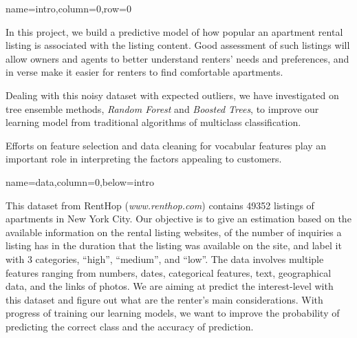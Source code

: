 \documentclass[landscape,final,a0paper,fontscale=0.285]{baposter}
\begin{document}
\begin{poster}
  {name=intro,column=0,row=0}{
   In this project, we build a predictive model of how popular an apartment rental listing is associated with the listing content. Good assessment of such listings will allow owners and agents to better understand renters' needs and preferences, and in verse make it easier for renters to find comfortable apartments. 
   \vspace{0.2em}
   
   Dealing with this noisy dataset with expected outliers, we have investigated on tree ensemble methods, \textit{Random Forest} and \textit{Boosted Trees}, to improve our learning model from traditional algorithms of multiclass classification. 
   \vspace{0.2em}
   
   Efforts on feature selection and data cleaning for vocabular features play an important role in interpreting the factors appealing to customers. 
   \vspace{0.3em}
}

  {name=data,column=0,below=intro}{%
  This dataset from RentHop (\textit{www.renthop.com}) contains 49352 listings of apartments in New York City. Our objective is to give an estimation based on the available information on the rental listing websites, of the number of inquiries a listing has in the duration that the listing was available on the site, and label it with 3 categories, ``high'', ``medium'', and ``low''. %
  The data involves multiple features ranging from numbers, dates, categorical features, text, geographical data, and the links of photos. We are aiming at predict the interest-level with this dataset and figure out what are the renter's main considerations.
  With progress of training our learning models, we want to improve the probability of predicting the correct class and the accuracy of prediction. 
  
}
\end{poster}
\end{document}
